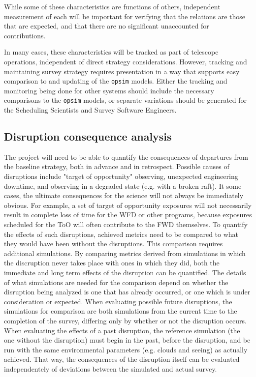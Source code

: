 While some of these characteristics are functions of others, independent measurement of each will be important for verifying that the relations are those that are expected, and that there are no significant unaccounted for contributions.

In many cases, these characteristics will be tracked as part of telescope operations, independent of direct strategy considerations.
However, tracking and maintaining survey strategy requires presentation in a way that supports easy comparison to and updating of the \texttt{opsim} models.
Either the tracking and monitoring being done for other systems should include the necessary comparisons to the \texttt{opsim} models, or separate variations should be generated for the Scheduling Scientists and Survey Software Engineers.

\subsection{Disruption consequence analysis}
\label{sec:org8fcd3d8}
The project will need to be able to quantify the consequences of departures from the baseline strategy, both in advance and in retrospect. 
Possible causes of disruptions include "target of opportunity" observing, unexpected engineering downtime, and observing in a degraded state (e.g. with a broken raft). 
It some cases, the ultimate consequences for the science will not always be immediately obvious.
For example, a set of target of opportunity exposures will not necessarily result in complete loss of time for the WFD or other programs, because exposures scheduled for the ToO will often contribute to the FWD themselves. 
To quantify the effects of such disruptions, achieved metrics need to be compared to what they would have been without the disruptions.
This comparison requires additional simulations.
By comparing metrics derived from simulations in which the discruption never takes place with ones in which they did, both the immediate and long term effects of the disruption can be quantified.
The details of what simulations are needed for the comparison depend on whether the disruption being analyzed is one that has already occurred, or one which is under consideration or expected.
When evaluating possible future disruptions, the simulations for comparison are both simulations from the current time to the completion of the survey, differing only by whether or not the disruption occurs.
When evaluating the effects of a past disruption, the reference simulation (the one without the disruption) must begin in the past, before the disruption, and be run with the same environmental parameters (e.g. clouds and seeing) as actually achieved.
That way, the consequences of the disruption itself can be evaluated independentely of deviations between the simulated and actual survey.

